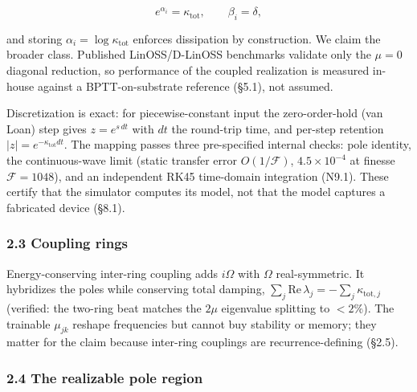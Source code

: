 \documentclass[
  10pt,
]{article}
\begin{document}
\[e^{\alpha_i} = \kappa_\mathrm{tot}, \qquad \beta_i = \delta,\]

and storing \(\alpha_i = \log\kappa_\mathrm{tot}\) enforces dissipation
by construction. We claim the broader class. Published LinOSS/D-LinOSS
benchmarks validate only the \(\mu = 0\) diagonal reduction, so
performance of the coupled realization is measured in-house against a
BPTT-on-substrate reference (§5.1), not assumed.

Discretization is exact: for piecewise-constant input the
zero-order-hold (van Loan) step gives \(z = e^{s\,dt}\) with \(dt\) the
round-trip time, and per-step retention
\(|z| = e^{-\kappa_\mathrm{tot} dt}\). The mapping passes three
pre-specified internal checks: pole identity, the continuous-wave limit
(static transfer error \(O(1/\mathcal{F})\), \(4.5\times10^{-4}\) at
finesse \(\mathcal{F} = 1048\)), and an independent RK45 time-domain
integration (N9.1). These certify that the simulator computes its model,
not that the model captures a fabricated device (§8.1).

\subsubsection{2.3 Coupling rings}\label{coupling-rings}

Energy-conserving inter-ring coupling adds \(i\Omega\) with \(\Omega\)
real-symmetric. It hybridizes the poles while conserving total damping,
\(\sum_j \mathrm{Re}\,\lambda_j = -\sum_j \kappa_{\mathrm{tot},j}\)
(verified: the two-ring beat matches the \(2\mu\) eigenvalue splitting
to \(<2\%\)). The trainable \(\mu_{jk}\) reshape frequencies but cannot
buy stability or memory; they matter for the claim because inter-ring
couplings are recurrence-defining (§2.5).

\subsubsection{2.4 The realizable pole
region}\label{the-realizable-pole-region}
\end{document}
